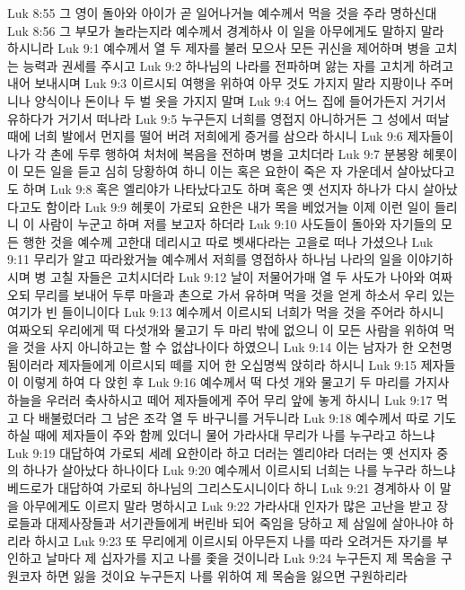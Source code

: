 Luk 8:55  그 영이 돌아와 아이가 곧 일어나거늘 예수께서 먹을 것을 주라 명하신대
Luk 8:56  그 부모가 놀라는지라 예수께서 경계하사 이 일을 아무에게도 말하지 말라 하시니라
Luk 9:1  예수께서 열 두 제자를 불러 모으사 모든 귀신을 제어하며 병을 고치는 능력과 권세를 주시고
Luk 9:2  하나님의 나라를 전파하며 앓는 자를 고치게 하려고 내어 보내시며
Luk 9:3  이르시되 여행을 위하여 아무 것도 가지지 말라 지팡이나 주머니나 양식이나 돈이나 두 벌 옷을 가지지 말며
Luk 9:4  어느 집에 들어가든지 거기서 유하다가 거기서 떠나라
Luk 9:5  누구든지 너희를 영접지 아니하거든 그 성에서 떠날 때에 너희 발에서 먼지를 떨어 버려 저희에게 증거를 삼으라 하시니
Luk 9:6  제자들이 나가 각 촌에 두루 행하여 처처에 복음을 전하며 병을 고치더라
Luk 9:7  분봉왕 헤롯이 이 모든 일을 듣고 심히 당황하여 하니 이는 혹은 요한이 죽은 자 가운데서 살아났다고도 하며
Luk 9:8  혹은 엘리야가 나타났다고도 하며 혹은 옛 선지자 하나가 다시 살아났다고도 함이라
Luk 9:9  헤롯이 가로되 요한은 내가 목을 베었거늘 이제 이런 일이 들리니 이 사람이 누군고 하며 저를 보고자 하더라
Luk 9:10  사도들이 돌아와 자기들의 모든 행한 것을 예수께 고한대 데리시고 따로 벳새다라는 고을로 떠나 가셨으나
Luk 9:11  무리가 알고 따라왔거늘 예수께서 저희를 영접하사 하나님 나라의 일을 이야기하시며 병 고칠 자들은 고치시더라
Luk 9:12  날이 저물어가매 열 두 사도가 나아와 여짜오되 무리를 보내어 두루 마을과 촌으로 가서 유하며 먹을 것을 얻게 하소서 우리 있는 여기가 빈 들이니이다
Luk 9:13  예수께서 이르시되 너희가 먹을 것을 주어라 하시니 여짜오되 우리에게 떡 다섯개와 물고기 두 마리 밖에 없으니 이 모든 사람을 위하여 먹을 것을 사지 아니하고는 할 수 없삽나이다 하였으니
Luk 9:14  이는 남자가 한 오천명 됨이러라 제자들에게 이르시되 떼를 지어 한 오십명씩 앉히라 하시니
Luk 9:15  제자들이 이렇게 하여 다 앉힌 후
Luk 9:16  예수께서 떡 다섯 개와 물고기 두 마리를 가지사 하늘을 우러러 축사하시고 떼어 제자들에게 주어 무리 앞에 놓게 하시니
Luk 9:17  먹고 다 배불렀더라 그 남은 조각 열 두 바구니를 거두니라
Luk 9:18  예수께서 따로 기도하실 때에 제자들이 주와 함께 있더니 물어 가라사대 무리가 나를 누구라고 하느냐
Luk 9:19  대답하여 가로되 세례 요한이라 하고 더러는 엘리야라 더러는 옛 선지자 중의 하나가 살아났다 하나이다
Luk 9:20  예수께서 이르시되 너희는 나를 누구라 하느냐 베드로가 대답하여 가로되 하나님의 그리스도시니이다 하니
Luk 9:21  경계하사 이 말을 아무에게도 이르지 말라 명하시고
Luk 9:22  가라사대 인자가 많은 고난을 받고 장로들과 대제사장들과 서기관들에게 버린바 되어 죽임을 당하고 제 삼일에 살아나야 하리라 하시고
Luk 9:23  또 무리에게 이르시되 아무든지 나를 따라 오려거든 자기를 부인하고 날마다 제 십자가를 지고 나를 좇을 것이니라
Luk 9:24  누구든지 제 목숨을 구원코자 하면 잃을 것이요 누구든지 나를 위하여 제 목숨을 잃으면 구원하리라
